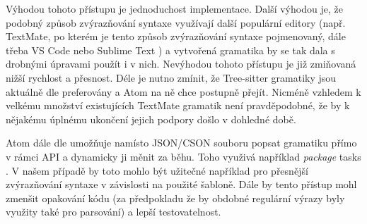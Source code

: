 Výhodou tohoto přístupu je jednoduchost implementace. Další výhodou je, že podobný způsob zvýrazňování syntaxe využívají
další populární editory (např. TextMate, po kterém je tento způsob zvýrazňování syntaxe pojmenovaný, dále třeba VS Code
\cite{vscode-docs} nebo Sublime Text \cite{sublime-text-docs}) a vytvořená gramatika by se tak dala s drobnými úpravami
použít i v nich. Nevýhodou tohoto přístupu je již zmiňovaná nižší rychlost a přesnost. Déle je nutno zmínit, že
Tree-sitter gramatiky jsou aktuálně dle \cite{atom-docs} preferovány a Atom na ně chce postupně přejít. Nicméně vzhledem
k velkému množství existujících TextMate gramatik není pravděpodobné, že by k nějakému úplnému ukončení jejich podpory
došlo v dohledné době.

Atom dále dle \cite{atom-docs} umožňuje namísto JSON/CSON souboru popsat gramatiku přímo v rámci API a dynamicky ji měnit
za běhu. Toho využivá například \textit{package} tasks \cite{atom-package-tasks}. V našem případě by toto mohlo být
užitečné například pro přesnější zvýrazňování syntaxe v závislosti na použité šabloně. Dále by tento přístup mohl
zmenšit opakování kódu (za předpokladu že by obdobné regulární výrazy byly využity také pro parsování) a lepší
testovatelnost.
